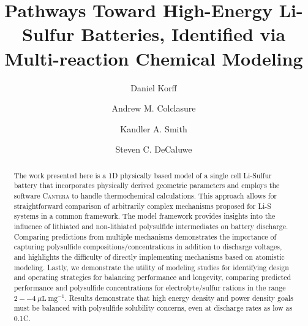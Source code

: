 \documentclass{elsarticle}
\begin{document}
\title{Pathways Toward High-Energy Li-Sulfur Batteries, Identified via Multi-reaction Chemical Modeling }


\author[csm]{Daniel Korff}

\author[nrel]{Andrew M. Colclasure}

\author[nrel]{Kandler A. Smith}

\author[csm]{Steven C. DeCaluwe}

\address[csm]{Department of Mechanical Engineering, Colorado School of Mines, Golden, Colorado, 80401}
\address[nrel]{National Renewable Energy Laboratory, Golden, Colorado, 80401}


\begin{abstract}
    The work presented here is a 1D physically based model of a single cell Li-Sulfur battery that incorporates physically derived geometric parameters and employs the software \textsc{Cantera} \cite{cantera} to handle thermochemical calculations. This approach allows for straightforward comparison of arbitrarily complex mechanisms proposed for Li-S systems in a common framework. The model framework provides insights into the influence of lithiated and non-lithiated polysulfide intermediates on battery discharge. Comparing predictions from multiple mechanisms demonstrates the importance of capturing polysulfide compositions/concentrations in addition to discharge voltages, and highlights the difficulty of directly implementing mechanisms based on atomistic modeling. Lastly, we demonstrate the utility of modeling studies for identifying design and operating strategies for balancing performance and longevity, comparing predicted performance and polysulfide concentrations for electrolyte/sulfur rations in the range $2--4 ~ \mu \mathrm{L} ~ \mathrm{mg}^{-1}$.  Results demonstrate that high energy density and power density goals must be balanced with polysulfide solubility concerns, even at discharge rates as low as 0.1C.
\end{abstract}

\maketitle


\end{document}
